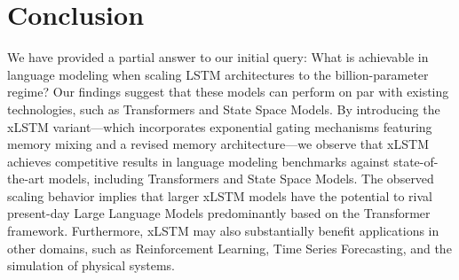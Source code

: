 \section{Conclusion}
We have provided a partial answer to our initial query: What is achievable in language modeling when scaling LSTM architectures to the billion-parameter regime? Our findings suggest that these models can perform on par with existing technologies, such as Transformers and State Space Models. By introducing the xLSTM variant—which incorporates exponential gating mechanisms featuring memory mixing and a revised memory architecture—we observe that xLSTM achieves competitive results in language modeling benchmarks against state-of-the-art models, including Transformers and State Space Models. The observed scaling behavior implies that larger xLSTM models have the potential to rival present-day Large Language Models predominantly based on the Transformer framework. Furthermore, xLSTM may also substantially benefit applications in other domains, such as Reinforcement Learning, Time Series Forecasting, and the simulation of physical systems.

